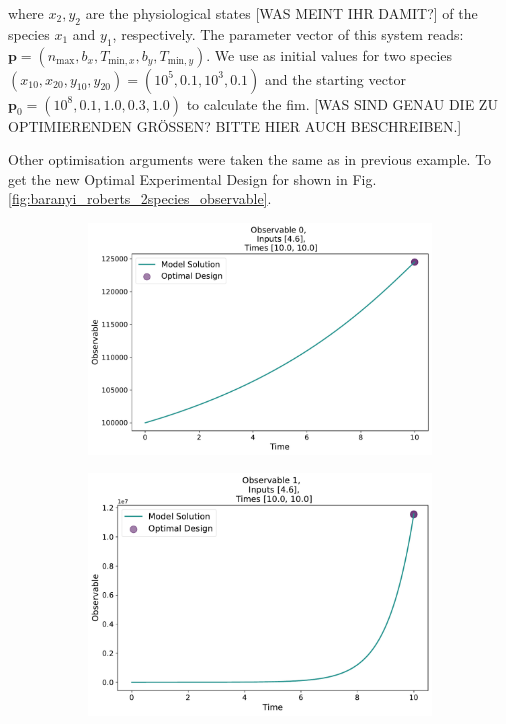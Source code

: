 \documentclass[10pt,A4paper]{article}
\newcommand{\mbp}{\mathbf{p}}
\begin{document}
where $x_2, y_2$ are the physiological states [WAS MEINT IHR DAMIT?] of the species $x_1$ and $y_1$, respectively.
The parameter vector of this system reads: $\mbp = (n_\text{max}, b_x, T_{\text{min}, x}, b_y, T_{\text{min}, y})$.
We use as initial values for two species $(x_{10}, x_{20}, y_{10}, y_{20}) = (10^5, 0.1, 10^3, 0.1)$ and the starting vector $\mbp_0= (10^8, 0.1, 1.0, 0.3, 1.0)$ to calculate the \ac{fim}.
[WAS SIND GENAU DIE ZU OPTIMIERENDEN GRÖSSEN? BITTE HIER AUCH BESCHREIBEN.]

Other optimisation arguments were taken the same as in previous example.
To get the new Optimal Experimental Design for shown in Fig. \ref{fig:baranyi_roberts_2species_observable}.
\begin{figure}[H]
    \begin{subfigure}{.5\textwidth}
        \centering
        \includegraphics[scale=0.27]{Figures/Observable_Results_baranyi_roberts_ode_fisher_determinant_2species_rel_sensit_cont_2times_2temps_000_x_00.pdf}
        \subcaption{}
      \end{subfigure}    
      \begin{subfigure}{.5\textwidth}
        \centering
        \includegraphics[scale=0.27]{Figures/Observable_Results_baranyi_roberts_ode_fisher_determinant_2species_rel_sensit_cont_2times_2temps_000_x_01.pdf}

\end{subfigure}
\end{figure}
\end{document}
